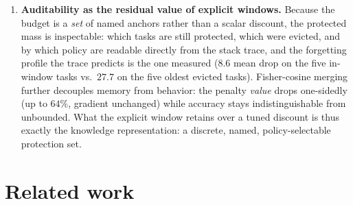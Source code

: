 \documentclass[review,11pt,number]{elsarticle}
\begin{document}
\begin{enumerate}
discount $\gamma$ shows that a tuned discount overtakes the budget on
accuracy at matched forgetting --- and that discounting is itself a
\emph{soft} bound. Across soft and hard bounds the learning term falls
log-linearly in the protected-mass horizon ($\ell \approx 84 - 11\ln
h$, $R^2{=}0.99$, per-seed $R^2 \geq 0.98$): bounding accumulated anchor
mass, not the mechanism enforcing it, is the active ingredient.
\item \textbf{Auditability as the residual value of explicit windows.}
Because the budget is a \emph{set} of named anchors rather than a
scalar discount, the protected mass is inspectable: which tasks are
still protected, which were evicted, and by which policy are readable
directly from the stack trace, and the forgetting profile the trace
predicts is the one measured ($8.6$ mean drop on the five in-window
tasks vs.\ $27.7$ on the five oldest evicted tasks). Fisher-cosine merging
further decouples memory from behavior: the penalty \emph{value} drops
one-sidedly (up to $64\%$, gradient unchanged) while accuracy stays
indistinguishable from unbounded. What the explicit window retains over
a tuned discount is thus exactly the knowledge representation: a
discrete, named, policy-selectable protection set.
\end{enumerate}

\section{Related work}
\label{sec:related}
\end{document}
